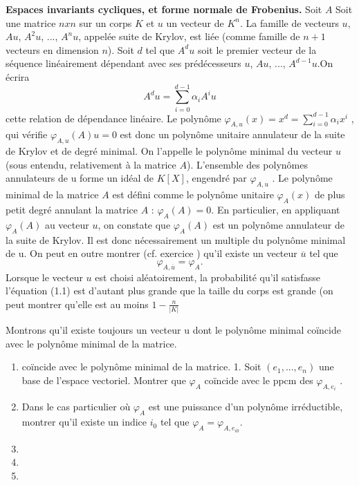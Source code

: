 \begin{flushright}
\textbf{Espaces invariants cycliques, et forme normale de Frobenius.} Soit $A$ Soit une matrice $n x n$ sur un 
corps $K$ et $u$ un vecteur de $K^{n}$. La famille de vecteurs $u$, $Au$, $A^{2}u$, ..., $A^{n}u$, appelée suite de 
Krylov, est liée (comme famille de $n + 1$ vecteurs en dimension $n$). Soit $d$ tel que $A^{d} u$ soit le
premier vecteur de la séquence linéairement dépendant avec ses prédécesseurs $u$, $Au$, ..., $A^{d-1}u$.On 
écrira
\[
	A^{d}u = \sum_{i=0}^{d-1} \alpha_{i} A^{i}u
\]
cette relation de dépendance linéaire. Le polynôme $\varphi_{A, u}\left(x\right) = x^{d} = \sum_{i=0}^{d-1} \alpha_{i}x^{i}$ , qui vérifie $\varphi_{A, u}\left(A\right)u = 0$ est donc un polynôme unitaire annulateur de la suite de Krylov et de degré minimal. On l’appelle le polynôme minimal du vecteur $u$ (sous
entendu, relativement à la matrice $A$). L’ensemble des polynômes annulateurs de u forme un idéal de $K\left[X\right]$, engendré par $\varphi_{A, u}$ .
Le polynôme minimal de la matrice $A$ est défini comme le polynôme unitaire
$\varphi_{A}\left(x\right)$ de plus petit degré annulant la matrice $A$ : $\varphi_{A}\left(A\right) = 0$. En particulier, en appliquant $\varphi_{A}\left(A\right)$ au vecteur $u$, on constate que $\varphi_{A}\left(A\right)$ est un polynôme annulateur de la suite de Krylov. Il est donc nécessairement un multiple du polynôme minimal de u. On peut en outre montrer (cf. exercice ) qu’il existe un vecteur $\overline{u}$ tel que
\begin{equation}
 \varphi_{A, \overline{u}} = \varphi_{A}.
\end{equation}
Lorsque le vecteur $u$ est choisi aléatoirement, la probabilité qu’il satisfasse l’équation (1.1) est d’autant plus grande que la taille du corps est grande (on peut montrer qu’elle est au moins $1-\frac{n}{\vert K \vert}$ 
\begin{exercise}
Montrons qu’il existe toujours un vecteur u dont le polynôme minimal coïncide avec le polynôme minimal de la matrice.
 \begin{enumerate}
    \item coïncide avec le polynôme minimal de la matrice. 1. Soit $\left(e_{1},..., e_{n}\right)$ une base de l’espace vectoriel. Montrer que $\varphi_{A}$ coïncide avec le ppcm des $\varphi_{A, e_{i}}$ .
    \item  Dans le cas particulier où $\varphi_{A}$ est une puissance d’un polynôme irréductible, montrer qu’il existe un indice $i_{0}$ tel que $\varphi_{A} =\varphi_{A, e_{i0}}$.
    \item 
    \item 
    \item 
  \end{enumerate}
\end{exercise}
\end{flushright}

